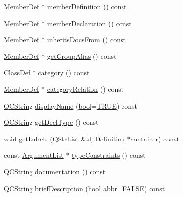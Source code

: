 \begin{DoxyCompactItemize}
\item 
\hyperlink{class_member_def}{Member\+Def} $\ast$ \hyperlink{class_member_def_afcc69cbddc9f03783e200fddf7f13b25}{member\+Definition} () const 
\item 
\hyperlink{class_member_def}{Member\+Def} $\ast$ \hyperlink{class_member_def_ae6da948a3c42baffbf64f2f61d20da6c}{member\+Declaration} () const 
\item 
\hyperlink{class_member_def}{Member\+Def} $\ast$ \hyperlink{class_member_def_a5a062d2dca26c2f2c20163e0947a7bbe}{inherits\+Docs\+From} () const 
\item 
\hyperlink{class_member_def}{Member\+Def} $\ast$ \hyperlink{class_member_def_a74c0d377e1b38bc386666c00909bd217}{get\+Group\+Alias} () const 
\item 
\hyperlink{class_class_def}{Class\+Def} $\ast$ \hyperlink{class_member_def_a156ebd416b1ed034fa798414995ed6c7}{category} () const 
\item 
\hyperlink{class_member_def}{Member\+Def} $\ast$ \hyperlink{class_member_def_a2b891876b4fcc2edfc40f976cb22f328}{category\+Relation} () const 
\item 
\hyperlink{class_q_c_string}{Q\+C\+String} \hyperlink{class_member_def_aec31a151e35b9512b33a4592fedf423d}{display\+Name} (\hyperlink{qglobal_8h_a1062901a7428fdd9c7f180f5e01ea056}{bool}=\hyperlink{qglobal_8h_a04a6422a52070f0dc478693da640242b}{T\+R\+U\+E}) const 
\item 
\hyperlink{class_q_c_string}{Q\+C\+String} \hyperlink{class_member_def_aa463d14e3e8caa20cd7cafe525cf5b3c}{get\+Decl\+Type} () const 
\item 
void \hyperlink{class_member_def_a9f305b077d811330e1426a4e47450583}{get\+Labels} (\hyperlink{class_q_str_list}{Q\+Str\+List} \&sl, \hyperlink{class_definition}{Definition} $\ast$container) const 
\item 
const \hyperlink{class_argument_list}{Argument\+List} $\ast$ \hyperlink{class_member_def_a56982cff4c1a479771c44926964a93c0}{type\+Constraints} () const 
\item 
\hyperlink{class_q_c_string}{Q\+C\+String} \hyperlink{class_member_def_aead2f8044ccb5ebf2a0dae14a57b5f71}{documentation} () const 
\item 
\hyperlink{class_q_c_string}{Q\+C\+String} \hyperlink{class_member_def_a437c57d43ff6da51ac2a2bbdd80e08c3}{brief\+Description} (\hyperlink{qglobal_8h_a1062901a7428fdd9c7f180f5e01ea056}{bool} abbr=\hyperlink{qglobal_8h_a10e004b6916e78ff4ea8379be80b80cc}{F\+A\+L\+S\+E}) const 
\item 

\end{DoxyCompactItemize}
